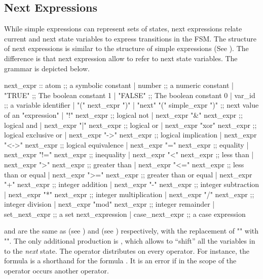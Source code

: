 \subsection{Next Expressions}
\label{Next Expressions}
%
While simple expressions can represent sets of states, next expressions
relate current and next state variables to express transitions in the
FSM.  The structure of next expressions is similar to the
structure of simple expressions (See ). The
difference is that next expression allow to refer to next state
variables. The grammar is depicted below.
%
\begin{Grammar}
next_expr ::
          atom                        ;; a symbolic constant
        | number                      ;; a numeric constant
        | "TRUE"                      ;; The boolean constant 1
        | "FALSE"                     ;; The boolean constant 0
        | var_id                      ;; a variable identifier
        | "(" next_expr ")"
        | "next" "(" simple_expr ")"  ;; next value of an "expression"
        | "!" next_expr               ;; logical not
        | next_expr "&" next_expr     ;; logical and
        | next_expr "|" next_expr     ;; logical or
        | next_expr "xor" next_expr   ;; logical exclusive or
        | next_expr "->" next_expr    ;; logical implication
        | next_expr "<->" next_expr   ;; logical equivalence
        | next_expr "=" next_expr     ;; equality
        | next_expr "!=" next_expr    ;; inequality
        | next_expr "<" next_expr     ;; less than
        | next_expr ">" next_expr     ;; greater than
        | next_expr "<=" next_expr    ;; less than or equal
        | next_expr ">=" next_expr    ;; greater than or equal
        | next_expr "+" next_expr     ;; integer addition
        | next_expr "-" next_expr     ;; integer subtraction
        | next_expr "*" next_expr     ;; integer multiplication
        | next_expr "/" next_expr     ;; integer division
        | next_expr "mod" next_expr   ;; integer remainder
        | set_next_expr               ;; a set next_expression
        | case_next_expr              ;; a case expression
\end{Grammar}
%
 and  are the same as
 (see ) and
 (see ) respectively,
with the replacement of "" with "".  The only
additional production is , which
allows to ``shift'' all the variables in  to the
\emph{next} state. The  operator distributes on every
operator. For instance, the formula  is a
shorthand for the formula . It is
an error if in the scope of the  operator occurs another
 operator.

